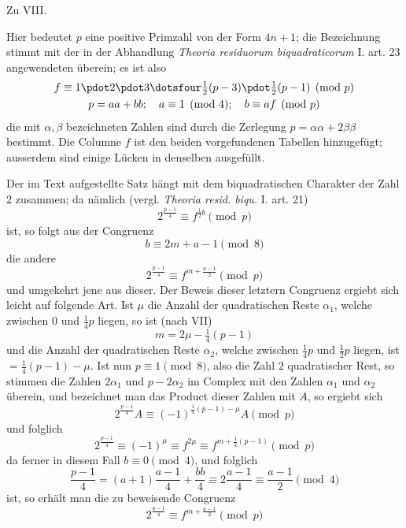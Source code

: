 \begin{center}\large Zu VIII.\end{center}

Hier bedeutet $p$ eine positive Primzahl von der Form $4n+1$; die Bezeichnung stimmt mit der in der Abhandlung \emph{Theoria residuorum biquadraticorum} I. art. 23 angewendeten überein; es ist also
\[
\begin{gathered}
f\equiv1\pdot2\pdot3\dotsfour\tfrac12(p-3)\pdot\tfrac12(p-1)\pmod p\\
p=aa+bb;\quad a\equiv1\pmod4;\quad b\equiv af\pmod p
\end{gathered}
\]
die mit $\alpha,\beta$ bezeichneten Zahlen sind durch die Zerlegung $p=\alpha\alpha+2\beta\beta$ bestimmt. Die Columne $f$ ist den beiden vorgefundenen Tabellen hinzugefügt; ausserdem sind einige Lücken in denselben ausgefüllt.

Der im Text aufgestellte Satz hängt mit dem biquadratischen Charakter der Zahl $2$ zusammen; da nämlich (vergl. \emph{Theoria resid. biqu.} I. art. 21)
\[
2^{\frac{p-1}4}\equiv f^{\frac12 b}\pmod p
\]
ist, so folgt aus der Congruenz
\[
b\equiv2m+a-1\pmod8
\]
die andere
\[
2^{\frac{p-1}4}\equiv f^{m+\frac{a-1}2}\pmod p
\]
und umgekehrt jene aus dieser. Der Beweis dieser letztern Congruenz ergiebt sich leicht auf folgende Art. Ist $\mu$ die Anzahl der quadratischen Reste $\alpha_1$, welche zwischen $0$ und $\frac14p$ liegen, so ist (nach VII)
\[
m=2\mu-\tfrac14(p-1)
\]
und die Anzahl der quadratischen Reste $\alpha_2$, welche zwischen $\frac14p$ und $\frac12p$ liegen, ist $=\frac14(p-1)-\mu$. Ist nun $p\equiv1\pmod8$, also die Zahl $2$ quadratischer Rest, so stimmen die Zahlen $2\alpha_1$ und $p-2\alpha_2$ im Complex mit den Zahlen $\alpha_1$ und $\alpha_2$ überein, und bezeichnet man das Product dieser Zahlen mit $A$, so ergiebt sich
\[
2^{\frac{p-1}4}A\equiv(-1)^{\frac14(p-1)-\mu}A\pmod p
\]
und folglich
\[
2^{\frac{p-1}4}\equiv(-1)^\mu\equiv f^{2\mu}\equiv f^{m+\frac14(p-1)}\pmod p
\]
da ferner in diesem Fall $b\equiv0\pmod4$, und folglich
\[
\frac{p-1}4=(a+1)\frac{a-1}4+\frac{bb}4\equiv2\frac{a-1}4\equiv\frac{a-1}2\pmod4
\]
ist, so erhält man die zu beweisende Congruenz
\[
2^{\frac{p-1}4}\equiv f^{m+\frac{a-1}2}\pmod p
\]

